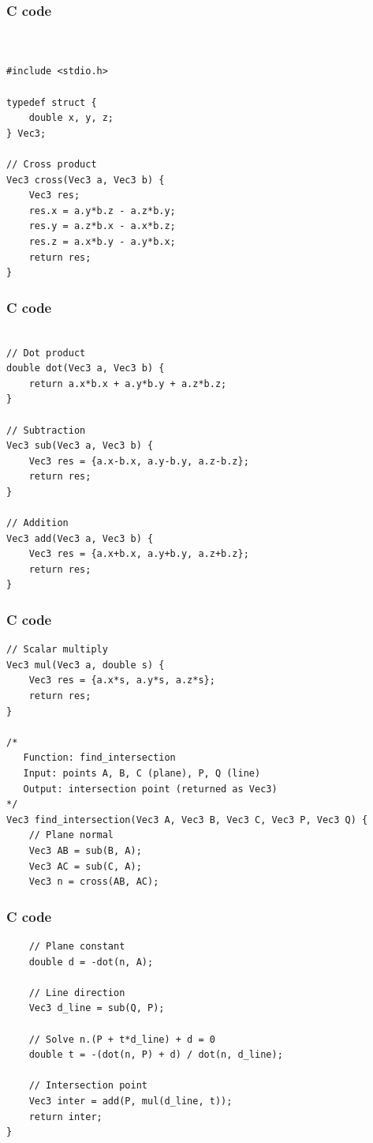 \documentclass{beamer}
\begin{document}
\begin{frame}[fragile]
    \frametitle{C code}
    \begin{lstlisting}


#include <stdio.h>

typedef struct {
    double x, y, z;
} Vec3;

// Cross product
Vec3 cross(Vec3 a, Vec3 b) {
    Vec3 res;
    res.x = a.y*b.z - a.z*b.y;
    res.y = a.z*b.x - a.x*b.z;
    res.z = a.x*b.y - a.y*b.x;
    return res;
}
\end{lstlisting}
 
\end{frame}
\begin{frame}[fragile]
    \frametitle{C code}
    \begin{lstlisting}
    
// Dot product
double dot(Vec3 a, Vec3 b) {
    return a.x*b.x + a.y*b.y + a.z*b.z;
}

// Subtraction
Vec3 sub(Vec3 a, Vec3 b) {
    Vec3 res = {a.x-b.x, a.y-b.y, a.z-b.z};
    return res;
}

// Addition
Vec3 add(Vec3 a, Vec3 b) {
    Vec3 res = {a.x+b.x, a.y+b.y, a.z+b.z};
    return res;
}
\end{lstlisting}
 
\end{frame}
\begin{frame}[fragile]
    \frametitle{C code}
    \begin{lstlisting}
// Scalar multiply
Vec3 mul(Vec3 a, double s) {
    Vec3 res = {a.x*s, a.y*s, a.z*s};
    return res;
}

/*
   Function: find_intersection
   Input: points A, B, C (plane), P, Q (line)
   Output: intersection point (returned as Vec3)
*/
Vec3 find_intersection(Vec3 A, Vec3 B, Vec3 C, Vec3 P, Vec3 Q) {
    // Plane normal
    Vec3 AB = sub(B, A);
    Vec3 AC = sub(C, A);
    Vec3 n = cross(AB, AC);
\end{lstlisting}
 
\end{frame}
\begin{frame}[fragile]
    \frametitle{C code}
    \begin{lstlisting}
    // Plane constant
    double d = -dot(n, A);

    // Line direction
    Vec3 d_line = sub(Q, P);

    // Solve n.(P + t*d_line) + d = 0
    double t = -(dot(n, P) + d) / dot(n, d_line);

    // Intersection point
    Vec3 inter = add(P, mul(d_line, t));
    return inter;
}

\end{lstlisting}
 
\end{frame}
\end{document}
